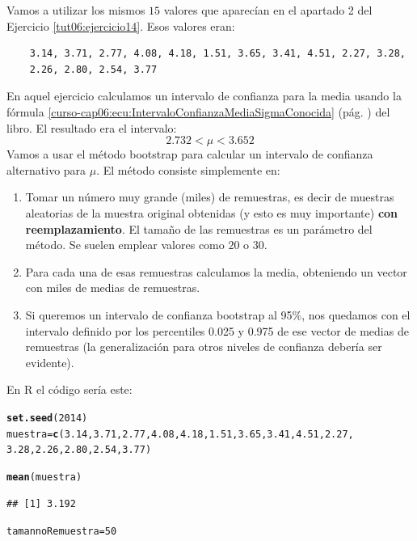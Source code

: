 \documentclass[10pt,a4paper]{article}\usepackage[]{graphicx}\usepackage[]{color}
\makeatletter
\newcommand{\hlnum}[1]{\textcolor[rgb]{0.686,0.059,0.569}{#1}}%
\newcommand{\hlstd}[1]{\textcolor[rgb]{0.345,0.345,0.345}{#1}}%
\newcommand{\hlkwb}[1]{\textcolor[rgb]{0.69,0.353,0.396}{#1}}%
\newcommand{\hlkwd}[1]{\textcolor[rgb]{0.737,0.353,0.396}{\textbf{#1}}}%
\newenvironment{kframe}{%
 \def\at@end@of@kframe{}%
 \ifinner\ifhmode%
  \def\at@end@of@kframe{\end{minipage}}%
  \begin{minipage}{\columnwidth}%
 \fi\fi%
 \def\FrameCommand##1{\hskip\@totalleftmargin \hskip-\fboxsep
 \colorbox{shadecolor}{##1}\hskip-\fboxsep
     \hskip-\linewidth \hskip-\@totalleftmargin \hskip\columnwidth}%
 \MakeFramed {\advance\hsize-\width
   \@totalleftmargin\z@ \linewidth\hsize
   \@setminipage}}%
 {\par\unskip\endMakeFramed%
 \at@end@of@kframe}
\newenvironment{knitrout}{}{} %
\makeatother
\begin{document}
\begin{ejercicio}
Vamos a utilizar los mismos $15$ valores que aparecían en el apartado 2 del Ejercicio \ref{tut06:ejercicio14}. Esos valores eran:
\begin{verbatim}
    3.14, 3.71, 2.77, 4.08, 4.18, 1.51, 3.65, 3.41, 4.51, 2.27, 3.28,
    2.26, 2.80, 2.54, 3.77
\end{verbatim}
En aquel ejercicio calculamos un intervalo de confianza para la media usando la fórmula \ref{curso-cap06:ecu:IntervaloConfianzaMediaSigmaConocida} (pág. \pageref{curso-cap06:ecu:IntervaloConfianzaMediaSigmaConocida}) del libro. El resultado era el intervalo:
    \[2.732 < \mu < 3.652\]
Vamos a usar el método bootstrap para calcular un intervalo de confianza alternativo para $\mu$. El método consiste simplemente en:
\begin{enumerate}
  \item Tomar un número muy grande (miles) de {\sf remuestras}, es decir de  muestras aleatorias de la muestra original obtenidas (y esto es muy importante) {\bf con reemplazamiento}. El tamaño de las remuestras es un parámetro del método. Se suelen emplear valores como $20$ o $30$.
  \item Para cada una de esas remuestras calculamos la media, obteniendo un vector con miles de medias de remuestras.
  \item Si queremos un intervalo de confianza bootstrap al 95\%, nos quedamos con el intervalo definido por los percentiles 0.025 y 0.975 de ese vector de medias de remuestras (la generalización para otros niveles de confianza debería ser evidente).
\end{enumerate}
En R el código sería este:
\begin{knitrout}
\color{fgcolor}\begin{kframe}
\begin{alltt}
\hlkwd{set.seed}\hlstd{(}\hlnum{2014}\hlstd{)}
\hlstd{muestra} \hlkwb{=} \hlkwd{c}\hlstd{(}\hlnum{3.14}\hlstd{,} \hlnum{3.71}\hlstd{,} \hlnum{2.77}\hlstd{,} \hlnum{4.08}\hlstd{,} \hlnum{4.18}\hlstd{,} \hlnum{1.51}\hlstd{,} \hlnum{3.65}\hlstd{,} \hlnum{3.41}\hlstd{,} \hlnum{4.51}\hlstd{,} \hlnum{2.27}\hlstd{,}
\hlnum{3.28}\hlstd{,}    \hlnum{2.26}\hlstd{,} \hlnum{2.80}\hlstd{,} \hlnum{2.54}\hlstd{,} \hlnum{3.77}\hlstd{)}

\hlkwd{mean}\hlstd{(muestra)}
\end{alltt}
\begin{verbatim}
## [1] 3.192
\end{verbatim}
\begin{alltt}
\hlstd{tamannoRemuestra} \hlkwb{=} \hlnum{50}


\end{alltt}
\end{kframe}
\end{knitrout}
\end{ejercicio}
\end{document}
